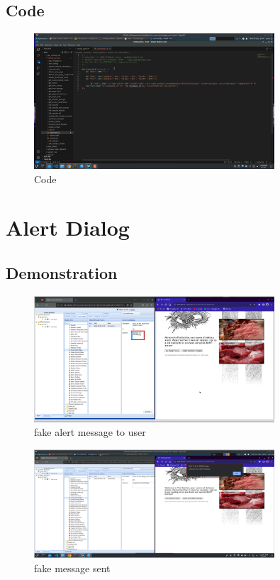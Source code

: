 \documentclass{report}
\begin{document}
\pagebreak

\subsection{Code}
\begin{figure}[!htbp]
    \centering
    \includegraphics[width=0.8\textwidth]{Redirect Browser(Rickroll)/code.png}
    \caption{Code}
    \label{fig:rr3}
\end{figure}

\pagebreak

\section{Alert Dialog}
\subsection{Demonstration}

\begin{figure}[!htbp]
    \centering
    \includegraphics[width=0.8\textwidth]{Alert Dialog/1.png}
    \caption{fake alert message to user}
    \label{fig:ad1}
\end{figure}

\begin{figure}[!htbp]
    \centering
    \includegraphics[width=0.8\textwidth]{Alert Dialog/2.png}
    \caption{fake message sent}
    \label{fig:ad2}
\end{figure}
\end{document}

